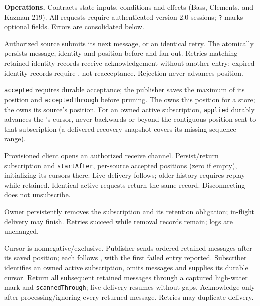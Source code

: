 \textbf{Operations.} Contracts state inputs, conditions and effects (Bass, Clements,
and Kazman 219). All requests require authenticated version-2.0 sessions; \texttt{?}
marks optional fields. Errors are consolidated below.
\begin{description}[nosep,leftmargin=1em,style=nextline]
\item[\opPublish\texttt{(message)}]
Authorized source submits its next message, or an identical retry. The \CFE
atomically persists message, identity and position before \opAck and fan-out.
Retries matching retained identity records receive acknowledgement without another
entry; expired identity records require \opResync, not reacceptance. Rejection never advances position.
\item[\opAck\texttt{(acknowledgement)}]
\texttt{accepted} requires durable \CFE acceptance; the publisher saves the maximum
of its position and \texttt{acceptedThrough} before pruning. The \Outbox owns this
position for a store; the \DCAgent owns its source's position.
For an owned active subscription, \texttt{applied} durably advances the \CFE's cursor,
never backwards or beyond the contiguous position sent to that subscription
(a delivered recovery snapshot covers its missing sequence range).
\item[\opSubscribe\texttt{(subscriberId, sourceFilter)}]
Provisioned client opens an authorized receive channel. Persist/return subscription
and \texttt{startAfter}, per-source accepted positions (zero if empty), initializing
its cursors there. Live delivery follows; older history requires replay while retained.
Identical active requests return the same record. Disconnecting does not unsubscribe.
\item[\opUnsubscribe\texttt{(subscriberId, subscriptionId)}]
Owner persistently removes the subscription and its retention obligation; in-flight
delivery may finish. Retries succeed while removal records remain; logs are unchanged.
\item[\opReplay\texttt{(role, source, afterSequence, subscriptionId?, messages?)}]
Cursor is nonnegative/exclusive. Publisher sends ordered retained messages after its
saved position; each follows \opPublish, with the first failed entry reported.
Subscriber identifies an owned active subscription, omits messages and supplies its
durable cursor. Return all subsequent retained messages through a captured high-water
mark and \texttt{scannedThrough}; live delivery resumes without gaps. Acknowledge
only after processing/ignoring every returned message. Retries may duplicate delivery.

\end{description}
